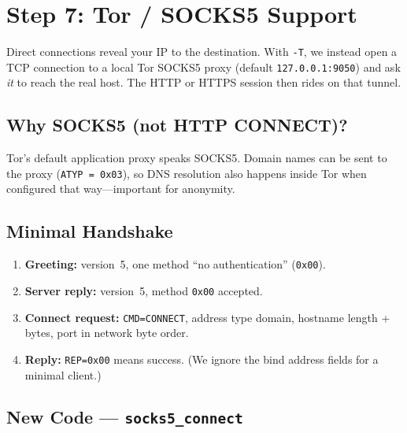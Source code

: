 \section{Step 7: Tor / SOCKS5 Support}

Direct connections reveal your IP to the destination. With \texttt{-T}, we
instead open a TCP connection to a local Tor SOCKS5 proxy (default
\texttt{127.0.0.1:9050}) and ask \emph{it} to reach the real host. The HTTP
or HTTPS session then rides on that tunnel.

\subsection{Why SOCKS5 (not HTTP CONNECT)?}

Tor's default application proxy speaks SOCKS5. Domain names can be sent to
the proxy (\texttt{ATYP = 0x03}), so DNS resolution also happens inside Tor
when configured that way---important for anonymity.

\subsection{Minimal Handshake}

\begin{enumerate}[leftmargin=1.4em]
    \item \textbf{Greeting:} version~5, one method ``no authentication''
          (\texttt{0x00}).
    \item \textbf{Server reply:} version~5, method \texttt{0x00} accepted.
    \item \textbf{Connect request:} \texttt{CMD=CONNECT}, address type domain,
          hostname length + bytes, port in network byte order.
    \item \textbf{Reply:} \texttt{REP=0x00} means success. (We ignore the
          bind address fields for a minimal client.)
\end{enumerate}

\subsection{New Code --- \texttt{socks5\_connect}}

